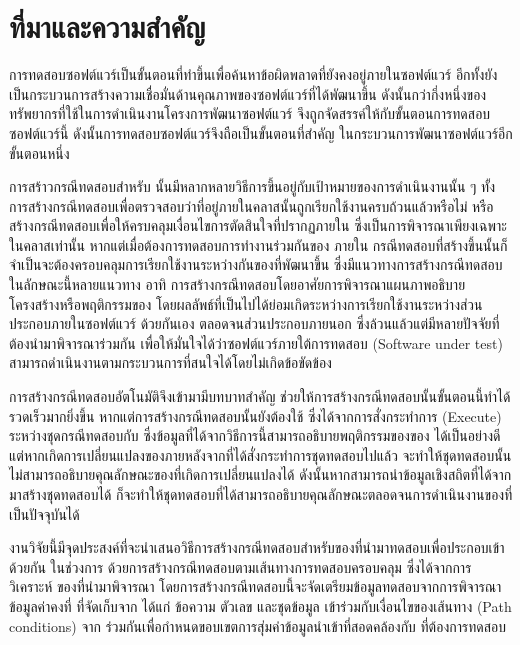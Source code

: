 \section{ที่มาและความสำคัญ} 
\label{sec:introduction}

การทดสอบซอฟต์แวร์เป็นขั้นตอนที่ทำขึ้นเพื่อค้นหาข้อผิดพลาดที่ยังคงอยู่ภายในซอฟต์แวร์ \cite{Myers:2011:AST:983238} 
อีกทั้งยังเป็นกระบวนการสร้างความเชื่อมั่นด้านคุณภาพของซอฟต์แวร์ที่ได้พัฒนาขึ้น ดังนั้นกว่ากึ่งหนึ่งของทรัพยากรที่ใช้ในการดำเนินงานโครงการพัฒนาซอฟต์แวร์
จึงถูกจัดสรรค์ให้กับขั้นตอนการทดสอบซอฟต์แวร์นี้ \cite{Jackson2007, Tassey2002} ดังนั้นการทดสอบซอฟต์แวร์จึงถือเป็นขั้นตอนที่สำคัญ
ในกระบวนการพัฒนาซอฟต์แวร์อีกขั้นตอนหนึ่ง

การสร้าวกรณีทดสอบสำหรับ\FirstTimeDefine{\SUT}{\SUTEN} นั้นมีหลากหลายวิธีการขึ้นอยู่กับเป้าหมายของการดำเนินงานนั้น ๆ 
ทั้งการสร้างกรณีทดสอบเพื่อตรวจสอบว่า{\method}ที่อยู่ภายในคลาสนั้นถูกเรียกใช้งานครบถ้วนแล้วหรือไม่ \cite{6847360}
หรือสร้างกรณีทดสอบเพื่อให้ครบคลุมเงื่อนไขการตัดสินใจที่ปรากฏภายใน{\class} \cite{Luanghirun2016} ซึ่งเป็นการพิจารณาเพียงเฉพาะในคลาสเท่านั้น
หากแต่เมื่อต้องการทดสอบการทำงานร่วมกันของ\FirstTimeDefine{\softwareComponent}{\softwareComponentEN} 
ภายใน\FirstTimeDefine{\SUT}{\SUTEN} กรณีทดสอบที่สร้างขึ้นนั้นก็จำเป็นจะต้องครอบคลุมการเรียกใช้งานระหว่างกันของ{\softwareComponent}ที่พัฒนาขึ้น
ซึ่งมีแนวทางการสร้างกรณีทดสอบในลักษณะนี้หลายแนวทาง อาทิ 
การสร้างกรณีทดสอบโดยอาศัยการพิจารณาแผนภาพอธิบายโครงสร้างหรือพฤติกรรมของ{\softwareComponent} \cite{Panthi2012, Shirole2013}
โดยผลลัพธ์ที่เป็นไปได้ย่อมเกิดระหว่างการเรียกใช้งานระหว่างส่วนประกอบภายในซอฟต์แวร์{\SUT} ด้วยกันเอง 
ตลอดจนส่วนประกอบภายนอก ซึ่งล้วนแล้วแต่มีหลายปัจจัยที่ต้องนำมาพิจารณาร่วมกัน เพื่อให้มั่นใจได้ว่าซอฟต์แวร์ภายใต้การทดสอบ (Software under test) 
สามารถดำเนินงานตามกระบวนการที่สนใจได้โดยไม่เกิดข้อขัดข้อง

การสร้างกรณีทดสอบอัตโนมัติจึงเข้ามามีบทบาทสำคัญ ช่วยให้การสร้างกรณีทดสอบนั้นขั้นตอนนี้ทำได้รวดเร็วมากยิ่งขึ้น 
หากแต่การสร้างกรณีทดสอบนั้นยังต้องใช้\FirstTimeDefine{\DynamicInformation}{\DynamicInformationEN}
ซึ่งได้จากการสั่งกระทำการ (Execute) ระหว่างชุดกรณีทดสอบกับ{\sourcecode} ซึ่งข้อมูลที่ได้จากวิธีการนี้สามารถอธิบายพฤติกรรมของ{\SUT}ของ{\sourcecode}
ได้เป็นอย่างดี แต่หากเกิดการเปลี่ยนแปลงของ{\sourcecode}ภายหลังจากที่ได้สั่งกระทำการชุดทดสอบไปแล้ว 
จะทำให้ชุดทดสอบนั้นไม่สามารถอธิบายคุณลักษณะของ{\sourcecode}ที่เกิดการเปลี่ยนแปลงได้ ดังนั้นหากสามารถนำข้อมูลเชิงสถิตที่ได้จาก{\sourcecode}
มาสร้างชุดทดสอบได้ ก็จะทำให้ชุดทดสอบที่ได้สามารถอธิบายคุณลักษณะตลอดจนการดำเนินงานของ{\SUT}ที่เป็นปัจจุบันได้

งานวิจัยนี้มีจุดประสงค์ที่จะนำเสนอวิธีการสร้างกรณีทดสอบสำหรับ{\sourcecode}ของ{\softwareComponent}ที่นำมาทดสอบเพื่อประกอบเข้าด้วยกัน
ในช่วงการ\FirstTimeDefine{\IntegrationTesting}{\IntegrationTestingEN} ด้วยการสร้างกรณีทดสอบตามเส้นทางการทดสอบครอบคลุม
{\scg} ซึ่งได้จากการวิเคราะห์\FirstTimeDefine{\StaticInformation}{\StaticInformationEN} ของ{\sourcecode}ที่นำมาพิจารณา 
โดยการสร้างกรณีทดสอบนี้จะจัดเตรียมข้อมูลทดสอบจากการพิจารณาข้อมูลค่าคงที่ ที่จัดเก็บจาก{\sourcecode} ได้แก่ ข้อความ ตัวเลข และชุดข้อมูล 
เข้าร่วมกับเงื่อนไขของเส้นทาง (Path conditions) จาก{\cfg} 
ร่วมกันเพื่อกำหนดขอบเขตการสุ่มค่าข้อมูลนำเข้าที่สอดคล้องกับ\FirstTimeDefine{\MethodSignature}{\MethodSignatureEN} ที่ต้องการทดสอบ
